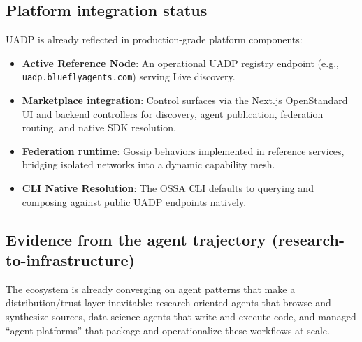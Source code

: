 \documentclass[11pt]{article}
\newcommand{\citedeepresearch}{}
\newcommand{\citebedrockagentcore}{}
\newcommand{\citedatabricksassistant}{}
\newcommand{\citelanggraphref}{}
\newcommand{\citeaifoundry}{}
\begin{document}
\subsection{Platform integration status}
UADP is already reflected in production-grade platform components:
\begin{itemize}
  \item \textbf{Active Reference Node}: An operational UADP registry endpoint (e.g., \texttt{uadp.blueflyagents.com}) serving Live discovery.
  \item \textbf{Marketplace integration}: Control surfaces via the Next.js OpenStandard UI and backend controllers for discovery, agent publication, federation routing, and native SDK resolution.
  \item \textbf{Federation runtime}: Gossip behaviors implemented in reference services, bridging isolated networks into a dynamic capability mesh.
  \item \textbf{CLI Native Resolution}: The OSSA CLI defaults to querying and composing against public UADP endpoints natively.
\end{itemize}

\subsection{Evidence from the agent trajectory (research-to-infrastructure)}
The ecosystem is already converging on agent patterns that make a distribution/trust layer inevitable: research-oriented agents that browse and synthesize sources, data-science agents that write and execute code, and managed ``agent platforms'' that package and operationalize these workflows at scale.\citedeepresearch\citebedrockagentcore\citedatabricksassistant\citelanggraphref\citeaifoundry
\end{document}
